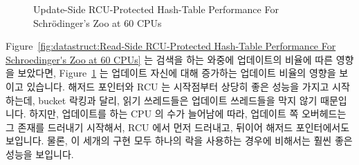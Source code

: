 \begin{figure}[tb]
\centering
{}
\caption{Update-Side RCU-Protected Hash-Table Performance For Schr\"odinger's Zoo at 60 CPUs}
\label{fig:datastruct:Update-Side RCU-Protected Hash-Table Performance For Schroedinger's Zoo at 60 CPUs}
\end{figure}

Figure~\ref{fig:datastruct:Read-Side RCU-Protected Hash-Table Performance For Schroedinger's Zoo at 60 CPUs}
는 검색을 하는 와중에 업데이트의 비율에 따른 영향을 보았다면,
Figure~\ref{fig:datastruct:Update-Side RCU-Protected Hash-Table Performance For Schroedinger's Zoo at 60 CPUs}
는 업데이트 자신에 대해 증가하는 업데이트 비율의 영향을 보이고 있습니다.
해저드 포인터와 RCU 는 시작점부터 상당히 좋은 성능을 가지고 시작하는데, bucket
락킹과 달리, 읽기 쓰레드들은 업데이트 쓰레드들을 막지 않기 때문입니다.
하지만, 업데이트를 하는 CPU 의 수가 늘어남에 따라, 업데이트 쪽 오버헤드는 그
존재를 드러내기 시작해서, RCU 에서 먼저 드러내고, 뒤이어 해저드 포인터에서도
보입니다.
물론, 이 세개의 구현 모두 하나의 락을 사용하는 경우에 비해서는 훨씬 좋은 성능을
보입니다.

